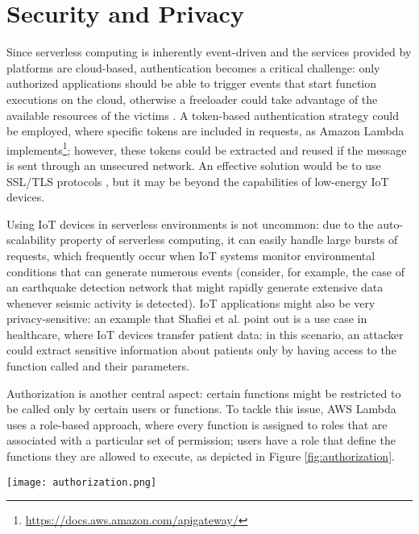 \documentclass[
	a4paper, %
	12pt,
	twoside, %
]{LTJournalArticle}
\begin{document}
\section{Security and Privacy}
Since serverless computing is inherently event-driven and the services provided by platforms are cloud-based, authentication becomes a critical challenge: only authorized applications should be able to trigger events that start function executions on the cloud, otherwise a freeloader could take advantage of the available resources of the victims \cite{shafiei_serverless_2022}. A token-based authentication strategy could be employed, where specific tokens are included in requests, as Amazon Lambda implements\footnote{\url{https://docs.aws.amazon.com/apigateway/}}; however, these tokens could be extracted and reused if the message is sent through an unsecured network. 
An effective solution would be to use SSL/TLS protocols \cite{freier_secure_2011, rescorla_transport_2018}, but it may be beyond the capabilities of low-energy IoT devices.

Using IoT devices in serverless environments is not uncommon: due to the auto-scalability property of serverless computing, it can easily handle large bursts of requests, which frequently occur when IoT systems monitor environmental conditions that can generate numerous events (consider, for example, the case of an earthquake detection network that might rapidly generate extensive data whenever seismic activity is detected). IoT applications might also be very privacy-sensitive: an example that Shafiei et al. \cite{shafiei_serverless_2022} point out is a use case in healthcare, where IoT devices transfer patient data: in this scenario, an attacker could extract sensitive information about patients only by having access to the function called and their parameters. 

Authorization is another central aspect: certain functions might be restricted to be called only by certain users or functions. To tackle this issue, AWS Lambda uses a role-based approach, where every function is assigned to roles that are associated with a particular set of permission; users have a role that define the functions they are allowed to execute, as depicted in Figure \ref{fig:authorization}. 
\begin{figure*}[!htb]
	\texttt{[image: authorization.png]}
	\caption{Authorization mechanism in serverless paradigm. Source: \cite{castro_rise_2019}}
	\label{fig:authorization}
\end{figure*}
\end{document}
